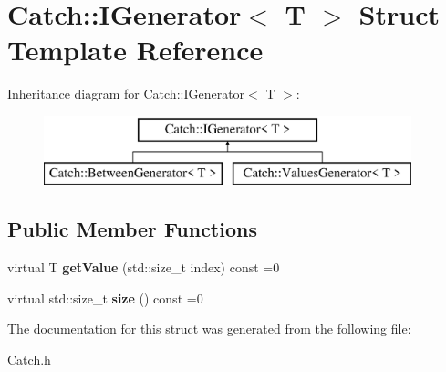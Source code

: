 \hypertarget{struct_catch_1_1_i_generator}{\section{Catch\-:\-:I\-Generator$<$ T $>$ Struct Template Reference}
\label{struct_catch_1_1_i_generator}
}
Inheritance diagram for Catch\-:\-:I\-Generator$<$ T $>$\-:\begin{figure}[H]
\begin{center}
\leavevmode
\includegraphics[height=2.000000cm]{struct_catch_1_1_i_generator}
\end{center}
\end{figure}
\subsection*{Public Member Functions}
\begin{DoxyCompactItemize}
\item 
\hypertarget{struct_catch_1_1_i_generator_ad69e937cb66dba3ed9429c42abf4fce3}{virtual T {\bfseries get\-Value} (std\-::size\-\_\-t index) const =0}\label{struct_catch_1_1_i_generator_ad69e937cb66dba3ed9429c42abf4fce3}

\item 
\hypertarget{struct_catch_1_1_i_generator_a2e317253b03e838b6065ce69719a198e}{virtual std\-::size\-\_\-t {\bfseries size} () const =0}\label{struct_catch_1_1_i_generator_a2e317253b03e838b6065ce69719a198e}

\end{DoxyCompactItemize}


The documentation for this struct was generated from the following file\-:\begin{DoxyCompactItemize}
\item 
Catch.\-h\end{DoxyCompactItemize}
